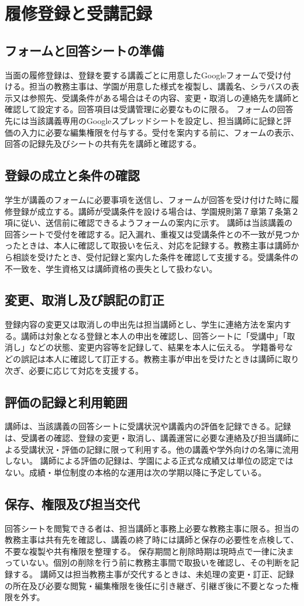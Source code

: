 ﻿\newpage
\chapter{履修登録と受講記録}

\section{フォームと回答シートの準備}

当面の履修登録は、登録を要する講義ごとに用意したGoogleフォームで受け付ける。担当の教務主事は、学園が用意した様式を複製し、講義名、シラバスの表示又は参照先、受講条件がある場合はその内容、変更・取消しの連絡先を講師と確認して設定する。回答項目は受講管理に必要なものに限る。
フォームの回答先には当該講義専用のGoogleスプレッドシートを設定し、担当講師に記録と評価の入力に必要な編集権限を付与する。受付を案内する前に、フォームの表示、回答の記録先及びシートの共有先を講師と確認する。

\section{登録の成立と条件の確認}

学生が講義のフォームに必要事項を送信し、フォームが回答を受け付けた時に履修登録が成立する。講師が受講条件を設ける場合は、学園規則第７章第７条第２項に従い、送信前に確認できるようフォームの案内に示す。
講師は当該講義の回答シートで受付を確認する。記入漏れ、重複又は受講条件との不一致が見つかったときは、本人に確認して取扱いを伝え、対応を記録する。教務主事は講師から相談を受けたとき、受付記録と案内した条件を確認して支援する。受講条件の不一致を、学生資格又は講師資格の喪失として扱わない。

\section{変更、取消し及び誤記の訂正}

登録内容の変更又は取消しの申出先は担当講師とし、学生に連絡方法を案内する。講師は対象となる登録と本人の申出を確認し、回答シートに「受講中」「取消し」などの状態、変更内容等を記録して、結果を本人に伝える。
学籍番号などの誤記は本人に確認して訂正する。教務主事が申出を受けたときは講師に取り次ぎ、必要に応じて対応を支援する。

\section{評価の記録と利用範囲}

講師は、当該講義の回答シートに受講状況や講義内の評価を記録できる。記録は、受講者の確認、登録の変更・取消し、講義運営に必要な連絡及び担当講師による受講状況・評価の記録に限って利用する。他の講義や学外向けの名簿に流用しない。
講師による評価の記録は、学園による正式な成績又は単位の認定ではない。成績・単位制度の本格的な運用は次の学期以降に予定している。

\section{保存、権限及び担当交代}

回答シートを閲覧できる者は、担当講師と事務上必要な教務主事に限る。担当の教務主事は共有先を確認し、講義の終了時には講師と保存の必要性を点検して、不要な複製や共有権限を整理する。
保存期間と削除時期は現時点で一律に決まっていない。個別の削除を行う前に教務主事間で取扱いを確認し、その判断を記録する。
講師又は担当教務主事が交代するときは、未処理の変更・訂正、記録の所在及び必要な閲覧・編集権限を後任に引き継ぎ、引継ぎ後に不要となった権限を外す。
